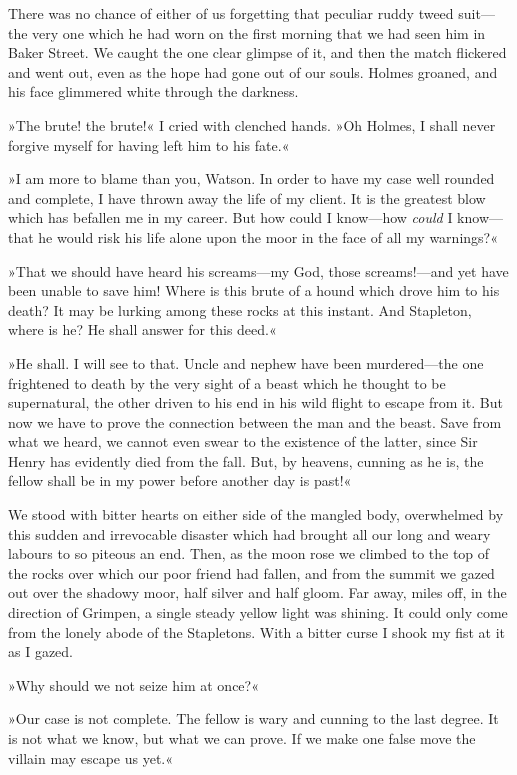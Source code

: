 There was no chance of either of us forgetting that peculiar ruddy tweed suit—the very one which he had worn on the first morning that we had seen him in Baker Street. We caught the one clear glimpse of it, and then the match flickered and went out, even as the hope had gone out of our souls. Holmes groaned, and his face glimmered white through the darkness.

»The brute! the brute!« I cried with clenched hands. »Oh Holmes, I shall never forgive myself for having left him to his fate.«

»I am more to blame than you, Watson. In order to have my case well rounded and complete, I have thrown away the life of my client. It is the greatest blow which has befallen me in my career. But how could I know—how \emph{could} I know—that he would risk his life alone upon the moor in the face of all my warnings?«

»That we should have heard his screams—my God, those screams!—and yet have been unable to save him! Where is this brute of a hound which drove him to his death? It may be lurking among these rocks at this instant. And Stapleton, where is he? He shall answer for this deed.«

»He shall. I will see to that. Uncle and nephew have been murdered—the one frightened to death by the very sight of a beast which he thought to be supernatural, the other driven to his end in his wild flight to escape from it. But now we have to prove the connection between the man and the beast. Save from what we heard, we cannot even swear to the existence of the latter, since Sir Henry has evidently died from the fall. But, by heavens, cunning as he is, the fellow shall be in my power before another day is past!«

We stood with bitter hearts on either side of the mangled body, overwhelmed by this sudden and irrevocable disaster which had brought all our long and weary labours to so piteous an end. Then, as the moon rose we climbed to the top of the rocks over which our poor friend had fallen, and from the summit we gazed out over the shadowy moor, half silver and half gloom. Far away, miles off, in the direction of Grimpen, a single steady yellow light was shining. It could only come from the lonely abode of the Stapletons. With a bitter curse I shook my fist at it as I gazed.

»Why should we not seize him at once?«

»Our case is not complete. The fellow is wary and cunning to the last degree. It is not what we know, but what we can prove. If we make one false move the villain may escape us yet.«

